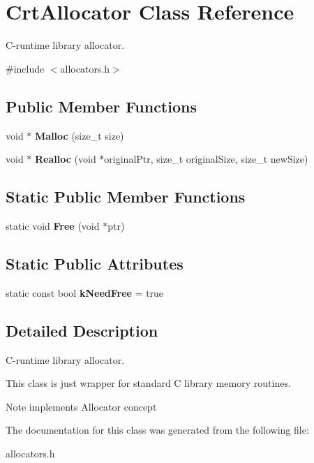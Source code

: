 \hypertarget{a01980}{}\section{Crt\+Allocator Class Reference}
\label{a01980}


C-\/runtime library allocator.  




{\ttfamily \#include $<$allocators.\+h$>$}

\subsection*{Public Member Functions}
\begin{DoxyCompactItemize}
\item 
\mbox{\label{a01980_acd720631f8c094041afa6c7951f0d935}} 
void $\ast$ {\bfseries Malloc} (size\+\_\+t size)
\item 
\mbox{\label{a01980_a646bb6f68afe773a62a22f7f14f83e97}} 
void $\ast$ {\bfseries Realloc} (void $\ast$original\+Ptr, size\+\_\+t original\+Size, size\+\_\+t new\+Size)
\end{DoxyCompactItemize}
\subsection*{Static Public Member Functions}
\begin{DoxyCompactItemize}
\item 
\mbox{\label{a01980_a5043907058d906dcb1291e9491560373}} 
static void {\bfseries Free} (void $\ast$ptr)
\end{DoxyCompactItemize}
\subsection*{Static Public Attributes}
\begin{DoxyCompactItemize}
\item 
\mbox{\label{a01980_ac7df8398c529290f0cd5950d9492f524}} 
static const bool {\bfseries k\+Need\+Free} = true
\end{DoxyCompactItemize}


\subsection{Detailed Description}
C-\/runtime library allocator. 

This class is just wrapper for standard C library memory routines. \begin{DoxyNote}{Note}
implements Allocator concept 
\end{DoxyNote}


The documentation for this class was generated from the following file\+:\begin{DoxyCompactItemize}
\item 
allocators.\+h\end{DoxyCompactItemize}

